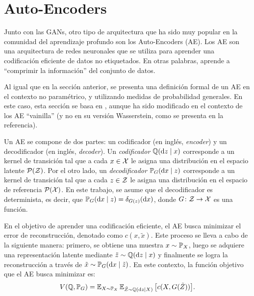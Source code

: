 {{%
}  %


\section{Auto-Encoders}\label{sec:auto-Encoders}
{
Junto con las GANs, otro tipo de arquitectura que ha sido muy popular en la comunidad del aprendizaje profundo son los Auto-Encoders (AE). Los AE son una arquitectura de redes neuronales que se utiliza para aprender una codificación eficiente de datos no etiquetados. En otras palabras, aprende a ``comprimir la información'' del conjunto de datos.

Al igual que en la sección anterior, se presenta una definición formal de un AE en el contexto no paramétrico, y utilizando medidas de probabilidad generales. En este caso, esta sección se basa en \cite{tolstikhin2017wasserstein}, aunque ha sido modificado en el contexto de los AE ``vainilla'' (y no en su versión Wasserstein, como se presenta en la referencia).

Un AE se compone de dos partes: un codificador (en inglés, \textit{encoder}) y un decodificador (en inglés, \textit{decoder}).
Un \textit{codificador} $ \ProbQ(\dz \mid x)$ corresponde a un kernel de transición tal que a cada $x \in \cX$ le asigna una distribución en el espacio latente $ \ProbSpace[\cZ] $.
Por el otro lado, un \textit{decodificador} $\Prob_G(\dx \mid z)$ corresponde a un kernel de transición tal que a cada $z \in \cZ$ le asigna una distribución en el espacio de referencia $\ProbSpace[\cX]$.
En este trabajo, se asume que el decodificador es determinista, es decir, que $\Prob_G(\dx \mid z) = \delta_{G(z)}(\dx)$, donde $G\colon \cZ \to \cX$ es una función.

En el objetivo de aprender una codificación eficiente, el AE busca minimizar el error de reconstrucción, denotado como $c(x, \tilde x)$. Este proceso se lleva a cabo de la siguiente manera: primero, se obtiene una muestra $x\sim \Prob_X$, luego se adquiere una representación latente mediante $\tilde z \sim \ProbQ(\dz \mid x)$ y finalmente se logra la reconstrucción a través de $\tilde x \sim \Prob_G(\dx \mid \tilde z)$. En este contexto, la función objetivo que el AE busca minimizar es:
\begin{equation}\label{eq:ae-obj-func}
    V(\ProbQ, \Prob_G) = \Exp_{X \sim \Prob_X} \Exp_{\tilde Z \sim \ProbQ(\dz \mid X)} \qty\big[ c(X, G(\tilde Z)) ].
\end{equation}

}}
